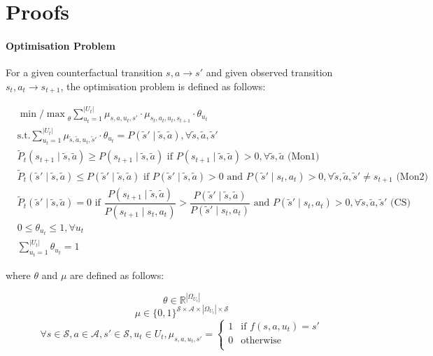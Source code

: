 \section{Proofs}
\paragraph{Optimisation Problem}
For a given counterfactual transition $s, a \rightarrow s'$ and given observed transition $s_t, a_t \rightarrow s_{t+1}$, the optimisation problem is defined as follows:

\begin{align}
&{\min / \max}_{\theta} \sum_{u_t = 1}^{|U_t|} \mu_{s, a, u_t, s'} \cdot \mu_{s_t, a_t, u_t, s_{t+1}} \cdot \theta_{u_t} \label{proofeq:objective}\\
&\text{s.t.} \sum_{u_t = 1}^{|U_t|} \mu_{\tilde{s}, \tilde{a}, u_t, \tilde{s}'} \cdot \theta_{u_t} = P(\tilde{s}' \mid \tilde{s}, \tilde{a}), \forall \tilde{s}, \tilde{a}, \tilde{s}' \label{proofeq:interventional constraint} \\
&\tilde{P}_t(s_{t+1} \mid \tilde{s}, \tilde{a}) \geq {P}(s_{t+1} \mid \tilde{s}, \tilde{a}) \text{ if } P(s_{t+1} \mid \tilde{s}, \tilde{a})>0, \forall\tilde{s},\tilde{a} \text{ (Mon1)} \label{proofeq:monotonicity1} \\
&\tilde{P}_t(\tilde{s}' \mid \tilde{s}, \tilde{a}) \leq {P}(\tilde{s}' \mid \tilde{s}, \tilde{a}) \text{ if } P(\tilde{s}' \mid \tilde{s}, \tilde{a})>0 \text{ and } P(\tilde{s}' \mid s_t, a_t)>0, \forall \tilde{s}, \tilde{a}, \tilde{s}'\neq s_{t+1} \text{ (Mon2)} \label{proofeq:monotonicity2} \\
&\tilde{P}_t(\tilde{s}' \mid \tilde{s}, \tilde{a}) = 0 \text{ if } \dfrac{P(s_{t+1} \mid \tilde{s}, \tilde{a})}{P(s_{t+1} \mid s_t, a_t)}>\dfrac{P(\tilde{s}' \mid \tilde{s}, \tilde{a})}{P(\tilde{s}' \mid s_t, a_t)} \text{ and } P(\tilde{s}' \mid s_t, a_t) > 0, \forall \tilde{s}, \tilde{a}, \tilde{s}' \text{ (CS)} \label{proofeq:counterfactual stability} \\
&0 \leq \theta_{u_t} \leq 1, \forall u_t \label{proofeq:valid prob1} \\
&\sum_{u_t = 1}^{|U_t|} \theta_{u_t} = 1 \label{proofeq:valid prob2}
\end{align}

where $\theta$ and $\mu$ are defined as follows:

\[\theta \in \mathbb{R}^{|\Omega_{U_t}|}\]
\[\mu \in \{0,1\}^{\mathcal{S} \times \mathcal{A} \times |\Omega_{U_t}| \times \mathcal{S}}\]
\[\forall s \in \mathcal{S}, a \in \mathcal{A}, s' \in \mathcal{S}, u_t \in U_t, \mu_{s, a, u_t, s'} = 
\begin{cases}
    1 & \text{if $f(s, a, u_t) = s'$}\\
    0 & \text{otherwise}\\
\end{cases}
\]

